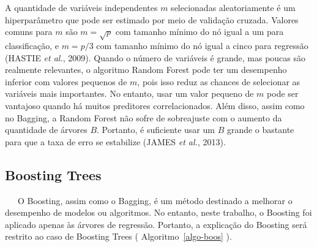 \documentclass[
  12pt,
  a4paper,
]{scrreprt}
\begin{document}
\vspace{12pt}

A quantidade de variáveis independentes \(m\) selecionadas
aleatoriamente é um hiperparâmetro que pode ser estimado por meio de
validação cruzada. Valores comuns para \(m\) são
\(m=\sqrt{p}\)\hspace{0pt} com tamanho mínimo do nó igual a um para
classificação, e \(m=p/3\)\hspace{0pt} com tamanho mínimo do nó igual a
cinco para regressão (HASTIE \emph{et al.}, 2009). Quando o número de
variáveis é grande, mas poucas são realmente relevantes, o algoritmo
Random Forest pode ter um desempenho inferior com valores pequenos de
\(m\), pois isso reduz as chances de selecionar as variáveis mais
importantes. No entanto, usar um valor pequeno de \(m\) pode ser
vantajoso quando há muitos preditores correlacionados. Além disso, assim
como no Bagging, a Random Forest não sofre de sobreajuste com o aumento
da quantidade de árvores \(B\). Portanto, é suficiente usar um \(B\)
grande o bastante para que a taxa de erro se estabilize (JAMES \emph{et
al.}, 2013).

\subsection{Boosting Trees}\label{boosting-trees}

~~~O Boosting, assim como o Bagging, é um método destinado a melhorar o
desempenho de modelos ou algoritmos. No entanto, neste trabalho, o
Boosting foi aplicado apenas às árvores de regressão. Portanto, a
explicação do Boosting será restrito ao caso de Boosting Trees
( Algoritmo~\ref{algo-boos} ).

\vspace{12pt}
\end{document}
